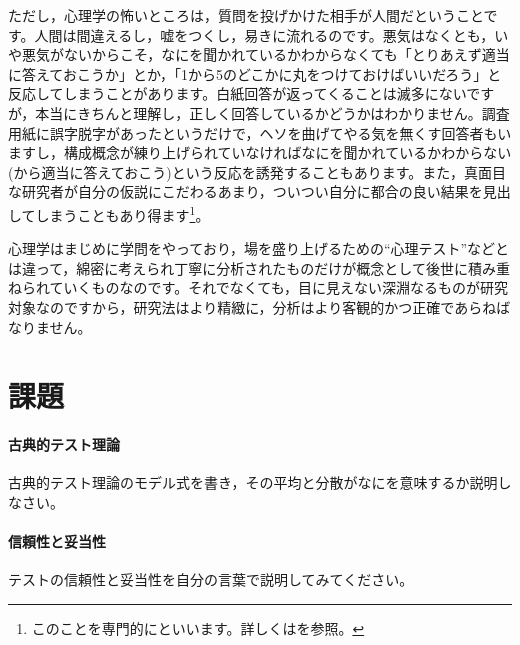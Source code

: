 \documentclass{ltjbook}
\begin{document}
ただし，心理学の怖いところは，質問を投げかけた相手が人間だということです。人間は間違えるし，嘘をつくし，易きに流れるのです。悪気はなくとも，いや悪気がないからこそ，なにを聞かれているかわからなくても「とりあえず適当に答えておこうか」とか，「1から5のどこかに丸をつけておけばいいだろう」と反応してしまうことがあります。白紙回答が返ってくることは滅多にないですが，本当にきちんと理解し，正しく回答しているかどうかはわかりません。調査用紙に誤字脱字があったというだけで，ヘソを曲げてやる気を無くす回答者もいますし，構成概念が練り上げられていなければなにを聞かれているかわからない(から適当に答えておこう)という反応を誘発することもあります。また，真面目な研究者が自分の仮説にこだわるあまり，ついつい自分に都合の良い結果を見出してしまうこともあり得ます\footnote{このことを専門的にといいます。詳しくは\textcite{kosugi2018}を参照。}。

心理学はまじめに学問をやっており，場を盛り上げるための``心理テスト''などとは違って，綿密に考えられ丁寧に分析されたものだけが概念として後世に積み重ねられていくものなのです。それでなくても，目に見えない深淵なるものが研究対象なのですから，研究法はより精緻に，分析はより客観的かつ正確であらねばなりません。

\section{課題}
\paragraph{古典的テスト理論}古典的テスト理論のモデル式を書き，その平均と分散がなにを意味するか説明しなさい。
\paragraph{信頼性と妥当性}テストの信頼性と妥当性を自分の言葉で説明してみてください。
\end{document}
